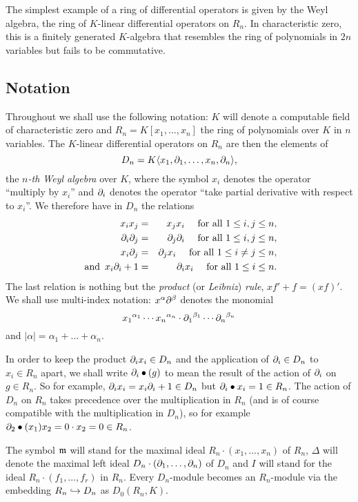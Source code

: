 The simplest example of a ring of differential
operators is given by the Weyl algebra, the ring of $K$-linear
differential operators on $R_n$. In characteristic
zero, this is a finitely generated $K$-algebra that resembles the ring
of polynomials in $2n$ variables but fails to be commutative.
\subsection{Notation} Throughout we shall use the following notation:
$K$ will 
denote a computable field 
of characteristic zero and $R_n=K[x_1,\ldots,x_n]$ the ring of polynomials
over $K$ in $n$ variables. The $K$-linear differential operators on
$R_n$ are
then the elements of  
\[D_n=K\langle
x_1,\partial_1,\ldots,x_n,\partial_n\rangle,
\]
the {\em $n$-th Weyl algebra}
 over $K$, where the symbol $x_i$ denotes the operator ``multiply by
 $x_i$'' and $\partial_i$ denotes the operator ``take partial
derivative with respect to $x_i$''. We therefore have in $D_n$ the relations
\begin{eqnarray*}
x_ix_j&=&x_jx_i\quad \text{ for all } 1\le i,j\le n,\\ 
\partial_i\partial_j&=&\partial_j\partial_i \quad \text{ for all } 1\le i,j\le n,\\
x_i\partial_j&=&\partial_jx_i \quad \text{ for all } 1\le i\not =j\le n,\\
\text{ and }\, x_i\partial_i+1&=&\partial_ix_i \quad \text{ for all } 1\le i\le n. 
\end{eqnarray*}
The last relation is nothing but
the {\em product} (or {\em Leibniz}) {\em rule}, 
$xf'+f=(xf)'$. 
We shall use multi-index notation: $x^\alpha\partial^\beta$ denotes the
monomial 
\[
{x_1}^{\alpha_1}\cdots {x_n}^{\alpha_n}\cdot
{\partial_1}^{\beta_1}\cdots{\partial_n}^{\beta_n}
\]
and $|\alpha|=\alpha_1+ \dots +\alpha_n$. 
 
In order to keep the product $\partial_i x_i\in D_n$ 
and the application of $\partial_i\in D_n$ to $x_i\in R_n$ apart, we shall
write $\partial_i\bullet (g)$ to mean the result of 
the action of $\partial_i$ on $g\in
R_n$. So for example, $\partial_ix_i=x_i\partial_i+1\in D_n$ but
$\partial_i\bullet x_i=1\in R_n$. The action of $D_n$ on $R_n$ takes
precedence over the multiplication in $R_n$ (and is of course
compatible with the multiplication in $D_n$), so for
example $\partial_2\bullet (x_1)x_2=0\cdot x_2=0\in R_n$.

The symbol
${\mathfrak m}$ will stand for the maximal ideal $R_n\cdot (x_1,\ldots,x_n)$ of
$R_n$, $\Delta$ will denote the maximal left ideal $D_n\cdot 
(\partial_1,\ldots,\partial_n)$
of $D_n$ and  $I$ will stand for the ideal $R_n\cdot (f_1,\ldots,f_r)$ in
$R_n$. Every $D_n$-module becomes an $R_n$-module via the embedding
$R_n\hookrightarrow D_n$ as $D_0(R_n,K)$. 


